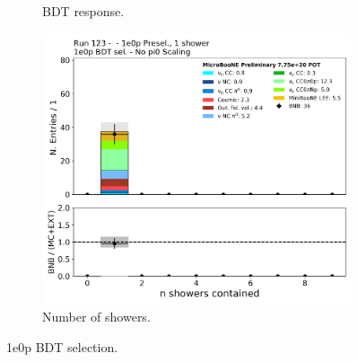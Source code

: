 \begin{figure}[H]
\begin{center}
\begin{subfigure}[b]{0.3\textwidth}
    \caption{\label{fig:fakedata:set4:zp_postsel_bdt} BDT response.}
    \end{subfigure}
    \begin{subfigure}[b]{0.3\textwidth}
    \centering
    \includegraphics[width=1.00\textwidth]{Fakedata/set4/zp_postsel_nshr.pdf}
    \caption{\label{fig:fakedata:set4:zp_postsel_nshr} Number of showers.}
    \end{subfigure}
\caption{\label{fig:fakedata:set4:zpsel} 1e0p BDT selection.}
\end{center}
\end{figure}

